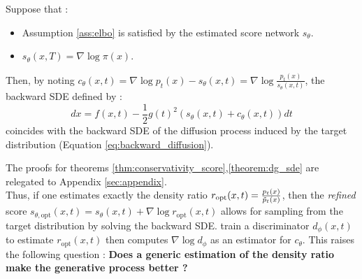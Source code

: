 \begin{theorem}\label{theorem:dg_sde}\citep{kim2023refininggenerativeprocessdiscriminator}
Suppose that :
\begin{itemize}
    \item Assumption \ref{ass:elbo} is satisfied by the estimated score network $s_{\theta}$.
    \item  $s_{\theta}(x,T) = \nabla \log \pi(x)$.
\end{itemize}
Then, by noting $c_{\theta}(x,t) = \nabla \log p_{t}(x) - s_{\theta}(x,t) = \nabla \log \frac{p_{t}(x)}{s_{\theta}(x,t)}$, the backward SDE defined by : 
\begin{equation}\label{eq:refined_backward_SDE}
    dx = f(x,t) - \frac{1}{2}g(t)^{2}(s_{\theta}(x,t) + c_{\theta}(x,t))dt
\end{equation}
coincides with the backward SDE of the diffusion process induced by the target distribution (Equation \ref{eq:backward_diffusion}).  
\end{theorem}
The proofs for theorems \ref{thm:conservativity_score},\ref{theorem:dg_sde} are relegated to Appendix \ref{sec:appendix}.\\
Thus, if one estimates exactly the density ratio $r_{\mathrm{opt}}(x,t) = \frac{p_{t}(x)}{\Tilde{p}_{t}(x)}$, then the \textit{refined} score $s_{\theta,\mathrm{opt}}(x,t) = s_{\theta}(x,t) + \nabla \log r_{\mathrm{opt}}(x,t)$ allows for sampling from the target distribution by solving the backward SDE. \citep{kim2023refininggenerativeprocessdiscriminator} train a discriminator $d_{\phi}(x,t)$ to estimate $r_{\mathrm{opt}}(x,t)$ then computes $\nabla \log d_{\phi}$ as an estimator for $c_{\theta}$. This raises the following question : \textbf{Does a generic estimation of the density ratio make the generative process better ?}
